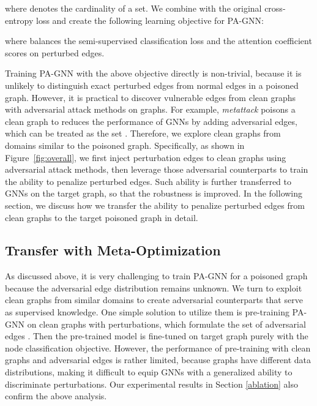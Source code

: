 \documentclass[sigconf]{acmart}
\newcommand{\ours}{{PA-GNN}\xspace}
\begin{document}
where  denotes the cardinality of a set.
We combine  with the original cross-entropy loss  and create the following learning objective for \ours:

where  balances the semi-supervised classification loss and the attention coefficient scores on perturbed edges.

Training \ours with the above objective directly is non-trivial, because it is unlikely to distinguish exact perturbed edges  from normal edges in a poisoned graph. However, it is practical to discover vulnerable edges from clean graphs with adversarial attack methods on graphs. 
For example, \textit{metattack} poisons a clean graph to reduces the performance of GNNs by adding adversarial edges, which can be treated as the set .
Therefore, we explore clean graphs from domains similar to the poisoned graph.
Specifically, as shown in Figure~\ref{fig:overall}, we first inject perturbation edges to clean graphs using adversarial attack methods, then leverage those adversarial counterparts to train the ability to penalize perturbed edges. 
Such ability is further transferred to GNNs on the target graph, so that the robustness is improved.
In the following section, we discuss how we transfer the ability to penalize perturbed edges from clean graphs to the target poisoned graph in detail.


\subsection{Transfer with Meta-Optimization} \label{meta_optim}
As discussed above, it is very challenging to train \ours for a poisoned graph because the adversarial edge distribution remains unknown.
We turn to exploit clean graphs from similar domains to create adversarial counterparts that serve as supervised knowledge.
One simple solution to utilize them is pre-training \ours on clean graphs with perturbations, which formulate the set of adversarial edges . Then the pre-trained model is fine-tuned on target graph  purely with the node classification objective.
However, the performance of pre-training with clean graphs and adversarial edges is rather limited, because graphs have different data distributions, making it difficult to equip GNNs with a generalized ability to discriminate perturbations. 
Our experimental results in Section \ref{ablation} also confirm the above analysis.
\end{document}
